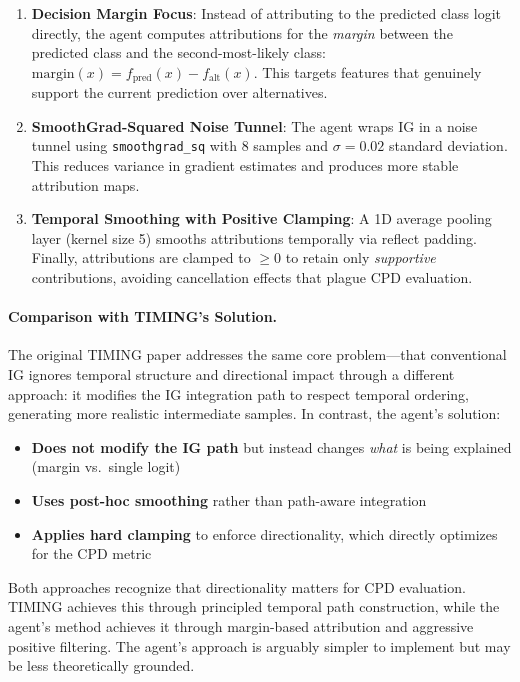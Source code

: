 \documentclass[11pt]{article}
\let\oldtexttt\texttt
\renewcommand{\texttt}[1]{{\fontseries{m}\selectfont\oldtexttt{#1}}}
\theoremstyle{plain}
\theoremstyle{definition}
\theoremstyle{remark}
\begin{document}
\begin{enumerate}
    \item \textbf{Decision Margin Focus}: Instead of attributing to the predicted class logit directly, the agent computes attributions for the \emph{margin} between the predicted class and the second-most-likely class: $\text{margin}(x) = f_{\text{pred}}(x) - f_{\text{alt}}(x)$. This targets features that genuinely support the current prediction over alternatives.

    \item \textbf{SmoothGrad-Squared Noise Tunnel}: The agent wraps IG in a noise tunnel using \texttt{smoothgrad\_sq} with 8 samples and $\sigma=0.02$ standard deviation. This reduces variance in gradient estimates and produces more stable attribution maps.

    \item \textbf{Temporal Smoothing with Positive Clamping}: A 1D average pooling layer (kernel size 5) smooths attributions temporally via reflect padding. Finally, attributions are clamped to $\geq 0$ to retain only \emph{supportive} contributions, avoiding cancellation effects that plague CPD evaluation.
\end{enumerate}

\paragraph{Comparison with TIMING's Solution.}
The original TIMING paper addresses the same core problem---that conventional IG ignores temporal structure and directional impact through a different approach: it modifies the IG integration path to respect temporal ordering, generating more realistic intermediate samples. In contrast, the agent's solution:
\begin{itemize}[noitemsep, nolistsep]
    \item \textbf{Does not modify the IG path} but instead changes \emph{what} is being explained (margin vs.\ single logit)
    \item \textbf{Uses post-hoc smoothing} rather than path-aware integration
    \item \textbf{Applies hard clamping} to enforce directionality, which directly optimizes for the CPD metric
\end{itemize}

Both approaches recognize that directionality matters for CPD evaluation. TIMING achieves this through principled temporal path construction, while the agent's method achieves it through margin-based attribution and aggressive positive filtering. The agent's approach is arguably simpler to implement but may be less theoretically grounded.
\end{document}
